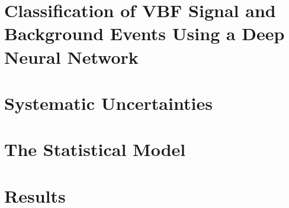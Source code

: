 \section{Classification of VBF Signal and Background Events Using a Deep Neural Network}
\label{sec:dnn}



\section{Systematic Uncertainties}
\label{sec:systematics}



\section{The Statistical Model}
\label{sec:stats-analysis}


\section{Results}
\label{sec:hww-results}

